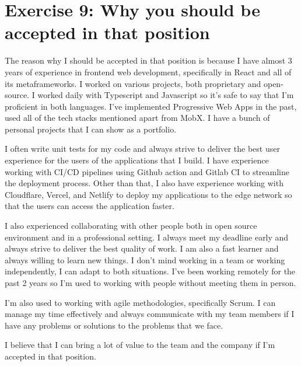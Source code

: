\documentclass[12pt,titlepage]{article}
\begin{document}
\section{Exercise 9: Why you should be accepted in that position}

The reason why I should be accepted in that position is because I have almost 3 years
of experience in frontend web development, specifically in React and all of its metaframeworks.
I worked on various projects, both proprietary and open-source. I worked daily with
Typescript and Javascript so it's safe to say that I'm proficient in both languages. 
I've implemented Progressive Web Apps in the past, used all of the tech stacks mentioned apart from MobX.
I have a bunch of personal projects that I can show as a portfolio.

I often write unit tests for my code and always strive to deliver the best user experience
for the users of the applications that I build. I have experience working with CI/CD pipelines
using Github action and Gitlab CI to streamline the deployment process. Other than that, I also
have experience working with Cloudflare, Vercel, and Netlify to deploy my applications
to the edge network so that the users can access the application faster.

I also experienced collaborating with other people both in open source environment and
in a professional setting. I always meet my deadline early and always strive to deliver
the best quality of work. I am also a fast learner and always willing to learn new things.
I don't mind working in a team or working independently, I can adapt to both situations.
I've been working remotely for the past 2 years so I'm used to working with people
without meeting them in person.

I'm also used to working with agile methodologies, specifically Scrum. I can
manage my time effectively and always communicate with my team members if I have any
problems or solutions to the problems that we face.

I believe that I can bring a lot of value to the team and the company if I'm accepted
in that position.
\end{document}
